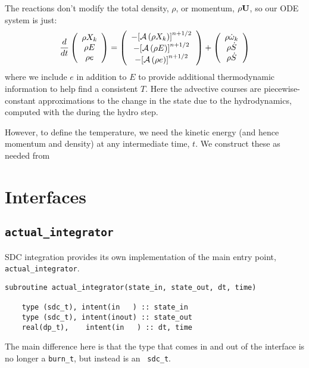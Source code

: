 The reactions don't modify the total density, $\rho$, or momentum,
$\rho {\bf U}$, so our ODE system is just:
\begin{equation}
\frac{d}{dt}\left ( 
   \begin{array}{c} \rho X_k \\ \rho E \\  \rho e \end{array} 
\right ) = 
\left ( \begin{array}{c}
   -{\left [\mathcal{A} \left(\rho X_k\right)\right]}^{n+1/2} \\ -{\left [\mathcal{A} \left(\rho E\right)\right]}^{n+1/2} \\ -{\left [\mathcal{A} \left(\rho e\right)\right]}^{n+1/2} \\
\end{array} \right ) +
\left (
   \begin{array}{c} \rho \dot{\omega}_k \\ \rho \dot{S} \\ \rho \dot{S} \end{array}
\right )
\end{equation}
where we include $e$ in addition to $E$ to provide additional thermodynamic 
information to help find a consistent $T$.  Here the advective courses
are piecewise-constant approximations to the change in the state due
to the hydrodynamics, computed with the during the hydro step.

However, to define the temperature, we need the kinetic energy (and
hence momentum and density) at any intermediate time, $t$.  We construct
these as needed from 


\section{Interfaces}

\subsection{{\tt actual\_integrator}}

SDC integration provides its own implementation of the main entry
point, {\tt actual\_integrator}.
\begin{lstlisting}[language={[95]fortran}]
  subroutine actual_integrator(state_in, state_out, dt, time)

    type (sdc_t), intent(in   ) :: state_in
    type (sdc_t), intent(inout) :: state_out
    real(dp_t),    intent(in   ) :: dt, time
\end{lstlisting}
The main difference here is that the type that comes in and out of the
interface is no longer a {\tt burn\_t}, but instead is an {\tt
  sdc\_t}.

